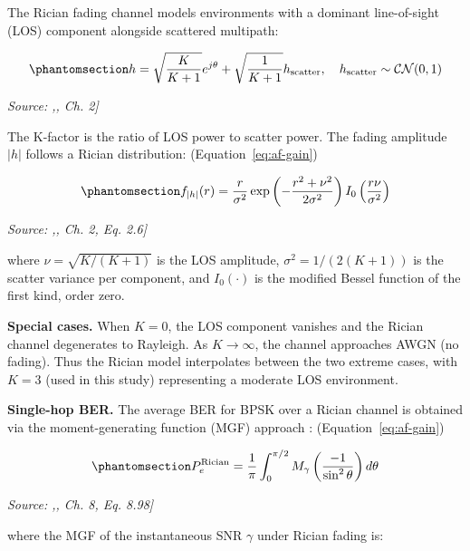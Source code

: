 The Rician fading channel models environments with a dominant line-of-sight (LOS) component alongside scattered multipath:

\begin{equation}\protect\phantomsection\label{eq:rician-channel}{h = \sqrt{\frac{K}{K+1}} e^{j\theta} + \sqrt{\frac{1}{K+1}} h_{\text{scatter}}, \quad h_{\text{scatter}} \sim \mathcal{CN}(0, 1)
}\end{equation}\par{\small\textit{Source: \cite{SimonAlouini2005FadingChannels},, Ch. 2]}}

The K-factor is the ratio of LOS power to scatter power. The fading amplitude \(|h|\) follows a Rician distribution: (Equation~\ref{eq:af-gain})

\begin{equation}\protect\phantomsection\label{eq:rician-pdf}{f_{|h|}(r) = \frac{r}{\sigma^2} \exp\left(-\frac{r^2 + \nu^2}{2\sigma^2}\right) I_0\left(\frac{r\nu}{\sigma^2}\right)
}\end{equation}\par{\small\textit{Source: \cite{SimonAlouini2005FadingChannels},, Ch. 2, Eq. 2.6]}}

where \(\nu = \sqrt{K/(K+1)}\) is the LOS amplitude, \(\sigma^2 = 1/(2(K+1))\) is the scatter variance per component, and \(I_0(\cdot)\) is the modified Bessel function of the first kind, order zero.

\textbf{Special cases.} When \(K = 0\), the LOS component vanishes and the Rician channel degenerates to Rayleigh. As \(K \to \infty\), the channel approaches AWGN (no fading). Thus the Rician model interpolates between the two extreme cases, with \(K=3\) (used in this study) representing a moderate LOS environment.

\textbf{Single-hop BER.} The average BER for BPSK over a Rician channel is obtained via the moment-generating function (MGF) approach \cite{SimonAlouini2005FadingChannels}: (Equation~\ref{eq:af-gain})

\begin{equation}\protect\phantomsection\label{eq:rician-ber-mgf}{P_e^{\text{Rician}} = \frac{1}{\pi} \int_0^{\pi/2} M_{\gamma}\left(\frac{-1}{\sin^2\theta}\right) d\theta
}\end{equation}\par{\small\textit{Source: \cite{SimonAlouini2005FadingChannels},, Ch. 8, Eq. 8.98]}}

where the MGF of the instantaneous SNR \(\gamma\) under Rician fading is:

